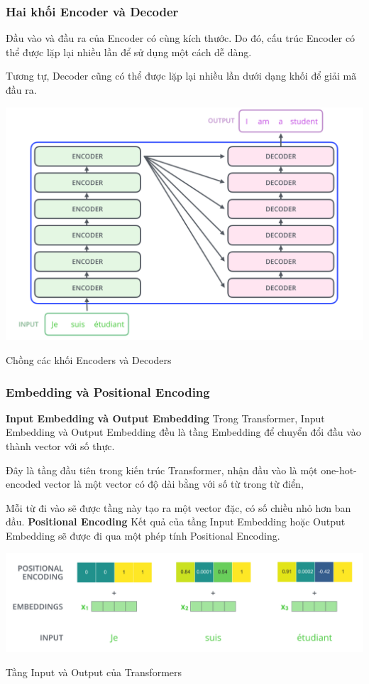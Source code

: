 \documentclass[a4paper, 12pt, openany]{book}
\begin{document}
\subsubsection{Hai khối Encoder và Decoder}
Đầu vào và đầu ra của Encoder có cùng kích thước. Do đó, cấu trúc Encoder có thể
được lặp lại nhiều lần để sử dụng một cách dễ dàng.

Tương tự, Decoder cũng có thể được lặp lại
nhiều lần dưới dạng khối để giải mã đầu ra.

\begin{minipage}{\linewidth}
    \captionsetup{type=figure}
    \centering
    \includegraphics[width=\linewidth]{./assets/images/The_transformer_encoder_decoder_stack.png}
    \caption{Chồng các khối Encoders và Decoders\cite{vaswani2023attention}}
\end{minipage}

\subsubsection{Embedding và Positional Encoding}
\textbf {Input Embedding và Output Embedding}
Trong Transformer, Input Embedding và Output Embedding đều là tầng Embedding
để chuyển đổi đầu vào thành vector với số thực.

Đây là tầng đầu tiên trong kiến trúc Transformer, nhận đầu vào là một
one-hot-encoded vector là một vector có độ dài bằng với số từ trong từ điển,

Mỗi từ đi vào sẽ được tầng này tạo ra một vector đặc, có số chiều nhỏ hơn ban đầu.
\textbf {Positional Encoding}
Kết quả của tầng Input Embedding hoặc Output Embedding
sẽ được đi qua một phép tính Positional Encoding.

\begin{minipage}{\linewidth}
    \captionsetup{type=figure}
    \centering
    \includegraphics[width=\linewidth]{./assets/images/transformer_input.png}
    \caption{Tầng Input và Output của Transformers\cite{vaswani2023attention}}
\end{minipage}
\end{document}
